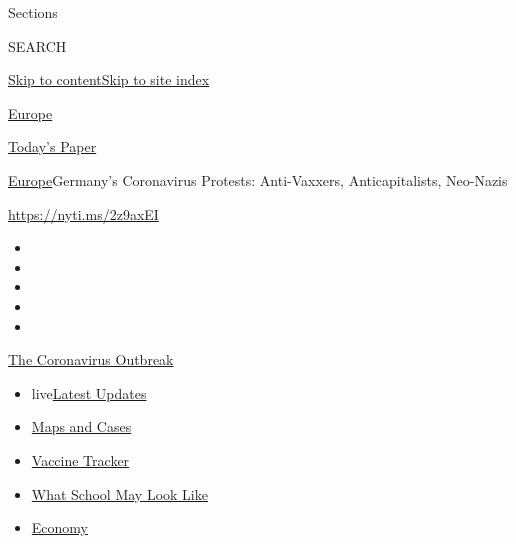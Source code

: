 Sections

SEARCH

\protect\hyperlink{site-content}{Skip to
content}\protect\hyperlink{site-index}{Skip to site index}

\href{https://www.nytimes.com/section/world/europe}{Europe}

\href{https://myaccount.nytimes.com/auth/login?response_type=cookie\&client_id=vi}{}

\href{https://www.nytimes.com/section/todayspaper}{Today's Paper}

\href{/section/world/europe}{Europe}\textbar{}Germany's Coronavirus
Protests: Anti-Vaxxers, Anticapitalists, Neo-Nazis

\url{https://nyti.ms/2z9axEI}

\begin{itemize}
\item
\item
\item
\item
\item
\end{itemize}

\href{https://www.nytimes.com/news-event/coronavirus?action=click\&pgtype=Article\&state=default\&region=TOP_BANNER\&context=storylines_menu}{The
Coronavirus Outbreak}

\begin{itemize}
\tightlist
\item
  live\href{https://www.nytimes.com/2020/08/01/world/coronavirus-covid-19.html?action=click\&pgtype=Article\&state=default\&region=TOP_BANNER\&context=storylines_menu}{Latest
  Updates}
\item
  \href{https://www.nytimes.com/interactive/2020/us/coronavirus-us-cases.html?action=click\&pgtype=Article\&state=default\&region=TOP_BANNER\&context=storylines_menu}{Maps
  and Cases}
\item
  \href{https://www.nytimes.com/interactive/2020/science/coronavirus-vaccine-tracker.html?action=click\&pgtype=Article\&state=default\&region=TOP_BANNER\&context=storylines_menu}{Vaccine
  Tracker}
\item
  \href{https://www.nytimes.com/interactive/2020/07/29/us/schools-reopening-coronavirus.html?action=click\&pgtype=Article\&state=default\&region=TOP_BANNER\&context=storylines_menu}{What
  School May Look Like}
\item
  \href{https://www.nytimes.com/live/2020/07/31/business/stock-market-today-coronavirus?action=click\&pgtype=Article\&state=default\&region=TOP_BANNER\&context=storylines_menu}{Economy}
\end{itemize}


